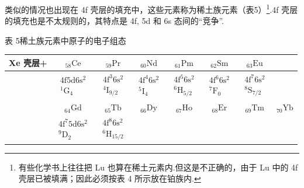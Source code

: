 类似的情况也出现在 4f 壳层的填充中，这些元素称为稀土族元素（表5）\footnote{有些化学书上往往把 Lu 也算在稀土元素内.但这是不正确的，由于 Lu 中的 4f 壳层已被填满；因此必须按表 4 所示放在铂族内.}.4f 壳层的填充也是不太规则的，其特点是 4f, 5d 和 6s 态间的“竞争”.

\begin{center}
{\heiti 表 5}\quad 稀土族元素中原子的电子组态\\[0.8em]
\small\setlength{\tabcolsep}{2.5pt}%
\begin{tabular}{|c||c|c|c|c|c|c|c|}
\hline
Xe 壳层+ & ${}_{58}\mathrm{Ce}$ & ${}_{59}\mathrm{Pr}$ & ${}_{60}\mathrm{Nd}$ & ${}_{61}\mathrm{Pm}$ & ${}_{62}\mathrm{Sm}$ & ${}_{63}\mathrm{Eu}$ & \\
\hline
 & $\begin{array}{c}4\mathrm{f}5\mathrm{d}6\mathrm{s}^{2}\\{}^{1}\mathrm{G}_{4}\end{array}$ &
$\begin{array}{c}4\mathrm{f}^{3}6\mathrm{s}^{2}\\{}^{4}\mathrm{I}_{9/2}\end{array}$ &
$\begin{array}{c}4\mathrm{f}^{4}6\mathrm{s}^{2}\\{}^{5}\mathrm{I}_{4}\end{array}$ &
$\begin{array}{c}4\mathrm{f}^{5}6\mathrm{s}^{2}\\{}^{6}\mathrm{H}_{5/2}\end{array}$ &
$\begin{array}{c}4\mathrm{f}^{6}6\mathrm{s}^{2}\\{}^{7}\mathrm{F}_{0}\end{array}$ &
$\begin{array}{c}4\mathrm{f}^{7}6\mathrm{s}^{2}\\{}^{8}\mathrm{S}_{7/2}\end{array}$ & \\
\hline
 & ${}_{64}\mathrm{Gd}$ & ${}_{65}\mathrm{Tb}$ & ${}_{66}\mathrm{Dy}$ & ${}_{67}\mathrm{Ho}$ & ${}_{68}\mathrm{Er}$ & ${}_{69}\mathrm{Tm}$ & ${}_{70}\mathrm{Yb}$\\
\hline
 & $\begin{array}{c}4\mathrm{f}^{7}5\mathrm{d}6\mathrm{s}^{2}\\{}^{9}\mathrm{D}_{2}\end{array}$ &
$\begin{array}{c}4\mathrm{f}^{8}6\mathrm{s}^{2}\\{}^{6}\mathrm{H}_{15/2}\end{array}$ &

\end{tabular}
\end{center}
